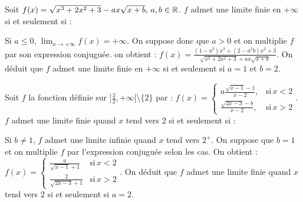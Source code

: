 \begin{question} 
Soit  $f(x)=\sqrt{x^3+2x^2+3}-ax\sqrt{x+b}, \, a,b \in \mathbb{R}$. $f$ admet une limite  finie en $+\infty$  si et seulement si  :
\begin{answers}

    
    
    
    
\end{answers}
\begin{explanations}
Si $a\le 0$, $\lim_{x\to +\infty} f(x)=+\infty$. On suppose donc que $a>0$ et on multiplie $f$ par son expression conjuguée. on obtient : 
$f(x)= \frac{(1-a^2)x^3+(2-a^2b)x^2+3}{\sqrt{x^3+2x^2+3}+ax\sqrt{x+b}}$. On déduit que $f$ admet une limite finie en $+\infty$ si et seulement si $a=1$ et $b=2$.
\end{explanations}

\end{question}



\begin{question} 
Soit  $f$ la fonction définie sur $]\frac{3}{2}, +\infty[ \setminus \{2\}$  par : $f(x)=\left\{\begin{array}{cc}a\frac{\sqrt{x-1}-1}{x-2},& \mbox{si} \, x<2  \\ \frac{\sqrt{2x-3}-b}{x-2},&  \mbox{si} \, x >2  \end{array}\right.$. $f$ admet une limite  finie quand $x$ tend vers $2$ si et seulement si :
\begin{answers}

    
      
    
    
\end{answers}
\begin{explanations}
Si $b\neq 1$, $f$ admet une limite infinie quand $x$ tend vers $2^+$. On suppose que $b=1$ et on multiplie $f$ par l'expression conjuguée selon les  cas. On obtient : 
$f(x)=\left\{\begin{array}{cc} \frac{a}{\sqrt{x-1}+1}& \mbox{si} \, x<2  \\ \frac{2}{\sqrt{2x-3}+1}&  \mbox{si} \, x >2  \end{array}\right.$. On déduit que $f$ admet une limite  finie quand $x$ tend vers $2$ si et seulement si $a=2$.
\end{explanations}

\end{question}


